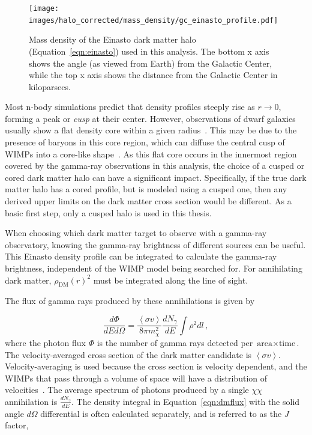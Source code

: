     \begin{figure}[!t]
      \centering
      \texttt{[image: images/halo\_corrected/mass\_density/gc\_einasto\_profile.pdf]}
      \caption[Galactic Center Einasto Halo Density]{
        Mass density of the Einasto dark matter halo (Equation~\ref{eqn:einasto}) used in this analysis.
        The bottom x axis shows the angle (as viewed from Earth) from the Galactic Center, while the top x axis shows the distance from the Galactic Center in kiloparsecs.
        \CaptionBlankLine
        }
      \label{fig:gchalo_density}
    \end{figure}

    
    Most n-body simulations predict that density profiles steeply rise as $r \rightarrow 0$, forming a peak or \textit{cusp} at their center.
    However, observations of dwarf galaxies usually show a flat density core within a given radius~\cite{flores1994observational,CoreVsCusp}.
    This may be due to the presence of baryons in this core region, which can diffuse the central cusp of WIMPs into a core-like shape~\cite{corecusp_baryondiffuse1,corecusp_baryondiffuse2}.
    As this flat core occurs in the innermost region covered by the gamma-ray observations in this analysis, the choice of a cusped or cored dark matter halo can have a significant impact.
    Specifically, if the true dark matter halo has a cored profile, but is modeled using a cusped one, then any derived upper limits on the dark matter cross section would be different.
    As a basic first step, only a cusped halo is used in this thesis.
    
    When choosing which dark matter target to observe with a gamma-ray observatory, knowing the gamma-ray brightness of different sources can be useful.
    This Einasto density profile can be integrated to calculate the gamma-ray brightness, independent of the WIMP model being searched for.
    For annihilating dark matter, $\rho_{\textrm{DM}}\left(r\right)^2$ must be integrated along the line of sight.
    
    The flux of gamma rays produced by these annihilations is given by
    
    \begin{equation}\label{eqn:dmflux}
      \frac{ d\Phi }{ dE d \Omega } = \frac{ \left \langle \sigma v \right \rangle }{8 \pi m_\chi^2} \frac{dN_{\gamma}}{dE} \int \rho^2 dl \, ,
    \end{equation}
    where the photon flux $\Phi$ is the number of gamma rays detected per $\textrm{area}\times\textrm{time}$.
    The velocity-averaged cross section of the dark matter candidate is $\left \langle \sigma v \right \rangle$.
    Velocity-averaging is used because the cross section is velocity dependent, and the WIMPs that pass through a volume of space will have a distribution of velocities~\cite{wimp_veldist}.
    The average spectrum of photons produced by a single $\chi\chi$ annihilation is $\frac{dN_{\gamma}}{dE}$.
    The density integral in Equation~\ref{eqn:dmflux} with the solid angle $d\Omega$ differential is often calculated separately, and is referred to as the $J$ factor,

